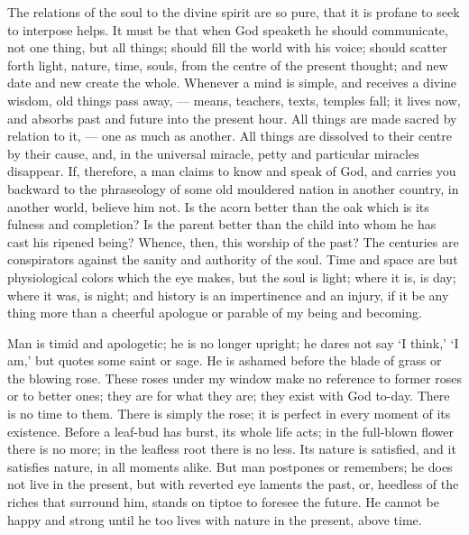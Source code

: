 \documentclass{article}
\begin{document}
The relations of the soul to the divine spirit are so pure, that it is
profane to seek to interpose helps. It must be that when God speaketh he
should communicate, not one thing, but all things; should fill the world
with his voice; should scatter forth light, nature, time, souls, from the
centre of the present thought; and new date and new create the whole.
Whenever a mind is simple, and receives a divine wisdom, old things pass
away, --- means, teachers, texts, temples fall; it lives now, and absorbs
past and future into the present hour. All things are made sacred by
relation to it, --- one as much as another. All things are dissolved to their
centre by their cause, and, in the universal miracle, petty and particular
miracles disappear. If, therefore, a man claims to know and speak of God,
and carries you backward to the phraseology of some old mouldered nation in
another country, in another world, believe him not. Is the acorn better than
the oak which is its fulness and completion? Is the parent better than the
child into whom he has cast his ripened being? Whence, then, this worship of
the past? The centuries are conspirators against the sanity and authority of
the soul. Time and space are but physiological colors which the eye makes,
but the soul is light; where it is, is day; where it was, is night; and
history is an impertinence and an injury, if it be any thing more than a
cheerful apologue or parable of my being and becoming.

Man is timid and apologetic; he is no longer upright; he dares not say `I
think,' `I am,' but quotes some saint or sage. He is ashamed before the
blade of grass or the blowing rose. These roses under my window make no
reference to former roses or to better ones; they are for what they are;
they exist with God to-day. There is no time to them. There is simply the
rose; it is perfect in every moment of its existence. Before a leaf-bud has
burst, its whole life acts; in the full-blown flower there is no more; in
the leafless root there is no less. Its nature is satisfied, and it
satisfies nature, in all moments alike. But man postpones or remembers; he
does not live in the present, but with reverted eye laments the past, or,
heedless of the riches that surround him, stands on tiptoe to foresee the
future. He cannot be happy and strong until he too lives with nature in the
present, above time.
\end{document}
